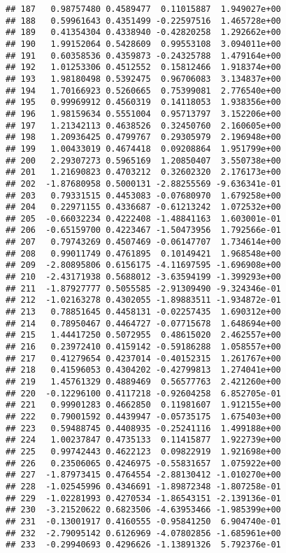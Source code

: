 \documentclass[
]{article}
\begin{document}
\begin{verbatim}
## 187   0.98757480 0.4589477  0.11015887  1.949027e+00
## 188   0.59961643 0.4351499 -0.22597516  1.465728e+00
## 189   0.41354304 0.4338940 -0.42820258  1.292662e+00
## 190   1.99152064 0.5428609  0.99553108  3.094011e+00
## 191   0.60358536 0.4359873 -0.24325788  1.479164e+00
## 192   1.01253306 0.4512552  0.15812466  1.918374e+00
## 193   1.98180498 0.5392475  0.96706083  3.134837e+00
## 194   1.70166923 0.5260665  0.75399081  2.776540e+00
## 195   0.99969912 0.4560319  0.14118053  1.938356e+00
## 196   1.98159634 0.5551004  0.95713797  3.152206e+00
## 197   1.21342113 0.4638526  0.32450760  2.160605e+00
## 198   1.20936425 0.4799767  0.29305979  2.196948e+00
## 199   1.00433019 0.4674418  0.09208864  1.951799e+00
## 200   2.29307273 0.5965169  1.20850407  3.550738e+00
## 201   1.21690823 0.4703212  0.32602320  2.176173e+00
## 202  -1.87680958 0.5000131 -2.88255569 -9.636341e-01
## 203   0.79331515 0.4453083 -0.07680970  1.679258e+00
## 204   0.22971155 0.4336687 -0.61213242  1.072532e+00
## 205  -0.66032234 0.4222408 -1.48841163  1.603001e-01
## 206  -0.65159700 0.4223467 -1.50473956  1.792566e-01
## 207   0.79743269 0.4507469 -0.06147707  1.734614e+00
## 208   0.99011749 0.4761895  0.10149421  1.968548e+00
## 209  -2.80895806 0.6156175 -4.11697595 -1.696908e+00
## 210  -2.43171938 0.5688012 -3.63594199 -1.399293e+00
## 211  -1.87927777 0.5055585 -2.91309490 -9.324346e-01
## 212  -1.02163278 0.4302055 -1.89883511 -1.934872e-01
## 213   0.78851645 0.4458131 -0.02257435  1.690312e+00
## 214   0.78950467 0.4464727 -0.07715678  1.648694e+00
## 215   1.44417250 0.5072955  0.48615020  2.462557e+00
## 216   0.23972410 0.4159142 -0.59186288  1.058557e+00
## 217   0.41279654 0.4237014 -0.40152315  1.261767e+00
## 218   0.41596053 0.4304202 -0.42799813  1.274041e+00
## 219   1.45761329 0.4889469  0.56577763  2.421260e+00
## 220  -0.12296100 0.4117218 -0.92604258  6.852705e-01
## 221   0.99901283 0.4662850  0.11981607  1.912155e+00
## 222   0.79001592 0.4439947 -0.05735175  1.675403e+00
## 223   0.59488745 0.4408935 -0.25241116  1.499188e+00
## 224   1.00237847 0.4735133  0.11415877  1.922739e+00
## 225   0.99742443 0.4622123  0.09822919  1.921698e+00
## 226   0.23506065 0.4246975 -0.55831657  1.075922e+00
## 227  -1.87973415 0.4764554 -2.88130412 -1.010270e+00
## 228  -1.02545996 0.4346691 -1.89872348 -1.807258e-01
## 229  -1.02281993 0.4270534 -1.86543151 -2.139136e-01
## 230  -3.21520622 0.6823506 -4.63953466 -1.985399e+00
## 231  -0.13001917 0.4160555 -0.95841250  6.904740e-01
## 232  -2.79095142 0.6126969 -4.07802856 -1.685961e+00
## 233  -0.29940693 0.4296626 -1.13891326  5.792376e-01

\end{verbatim}
\end{document}
